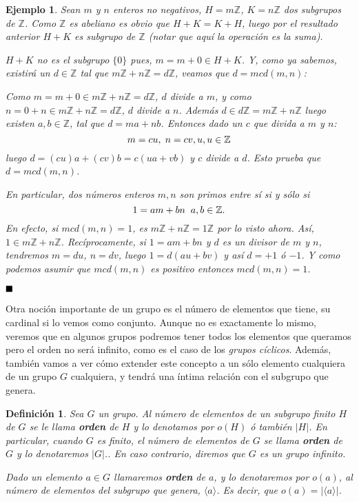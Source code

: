 \documentclass[12pt]{article}
\newtheorem{definition}[theorem]{Definición}
\newtheorem{example}{Ejemplo}[theorem]
\begin{document}
\begin{example} Sean $m$ y $n$ enteros no negativos, $H = m\mathbb{Z}$, $K = n\mathbb{Z}$ dos subgrupos de $\mathbb{Z}$. Como $\mathbb{Z}$ es abeliano es obvio que $H+K = K+H$, luego por el resultado anterior $H+K$ es subgrupo de $\mathbb{Z}$ (notar que aquí la operación es la suma).


$H+K$ no es el subgrupo $\lbrace 0 \rbrace$ pues, $m = m + 0 \in H + K$. Y, como ya sabemos, existirá un $d \in \mathbb{Z}$ tal que $m\mathbb{Z}+n\mathbb{Z} = d\mathbb{Z}$, veamos que $d = mcd(m,n)$:


Como $m = m + 0 \in m\mathbb{Z}+n\mathbb{Z} = d\mathbb{Z}$, $d$ divide a $m$, y como $n = 0 + n \in m\mathbb{Z}+n\mathbb{Z} = d\mathbb{Z}$, $d$ divide a $n$. Además $d \in d\mathbb{Z} = m\mathbb{Z} + n\mathbb{Z}$ luego existen $a,b \in \mathbb{Z}$, tal que $d = ma + nb$. Entonces dado un $c$ que divida a $m$ y $n$:
$$m = cu,\hspace{0.1cm} n = cv, u, u \in \mathbb{Z}$$ luego $d = (cu)a + (cv)b = c(ua + vb)$ y $c$ divide a $d$. Esto prueba que $d = mcd(m,n)$. 

En particular, dos números enteros $m,n$ son primos entre sí si y sólo si $$1 = am + bn \hspace{0.2cm} a,b \in \mathbb{Z}.$$ En efecto, si $mcd(m,n) = 1$, es $m\mathbb{Z} + n\mathbb{Z} = 1\mathbb{Z}$ por lo visto ahora. Así, $1 \in m\mathbb{Z}+n\mathbb{Z}$. Recíprocamente, si $1 = am + bn$ y $d$ es un divisor de $m$ y $n$, tendremos $m = du$, $n = dv$, luego $1 = d(au + bv)$ y así $d = +1$ ó $-1$. Y como podemos asumir que $mcd(m,n)$ es positivo entonces $mcd(m,n) = 1$.
\end{example}

$\hfill \blacksquare$

Otra noción importante de un grupo es el número de elementos que tiene, su cardinal si lo vemos como conjunto.  Aunque no es exactamente lo mismo, veremos que en algunos grupos podremos tener todos los elementos que queramos pero el orden no será infinito, como es el caso de los \textit{grupos cíclicos}. Además, también vamos a ver cómo extender este concepto a un sólo elemento cualquiera de un grupo $G$ cualquiera, y tendrá una íntima relación con el subgrupo que genera.

\begin{definition} Sea $G$ un grupo. Al número de elementos de un subgrupo finito $H$ de $G$ se le llama \textbf{orden} de $H$ y lo denotamos por $o(H)$ ó también $ |H|$. En particular, cuando $G$ es finito, el número de elementos de $G$ se llama \textbf{orden} de $G$ y lo denotaremos $|G|$.. En caso contrario, diremos que $G$ es un grupo infinito.


Dado un elemento $a \in G$ llamaremos \textbf{orden} de $a$, y lo denotaremos por $o(a)$, al número de elementos del subgrupo que genera, $\langle a \rangle$. Es decir, que $o(a) = | \langle a \rangle |$.
\end{definition}
\end{document}
